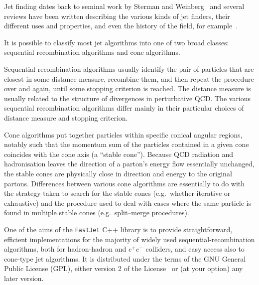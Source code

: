 \documentclass[12pt,a4]{article}
\newcommand{\fastjet}{\texttt{FastJet}\xspace}
\begin{document}
Jet finding dates back to seminal work by Sterman and
Weinberg~\cite{StermanWeinberg} and several reviews have been written
describing the various kinds of jet finders, their different uses and
properties, and even the history of the
field, for example~\cite{Moretti:1998qx,RunII-jet-physics,Ellis:2007ib,Salam:2009jx,Ali:2010tw}.

It is possible to classify most jet algorithms into one of two broad
classes: sequential recombination algorithms and cone algorithms.

Sequential recombination algorithms usually identify the pair of
particles that are closest in some distance measure, recombine them,
and then repeat the procedure over and again, until some stopping
criterion is reached. 
%
The distance measure is usually related to the structure of
divergences in perturbative QCD.
%
The various sequential recombination algorithms differ mainly in their
particular choices of distance measure and stopping criterion.

Cone algorithms put together particles within specific conical angular
regions, notably such that the momentum sum of the particles contained
in a given cone coincides with the cone axis (a ``stable cone'').
%
Because QCD radiation and hadronisation leaves the direction of a
parton's energy flow essentially unchanged, the stable cones are
physically close in direction and energy to the original partons.
%
Differences between various cone algorithms are essentially to do with
the strategy taken to search for the stable cones (e.g.\ whether
iterative or exhaustive) and the procedure used to deal with cases
where the same particle is found in multiple stable cones (e.g.\
split--merge procedures).

One of the aims of the \fastjet C++ library is to provide
straightforward, efficient implementations for the majority of widely
used sequential-recombination algorithms, both for hadron-hadron and
$e^+e^-$ colliders, and easy access also to cone-type jet algorithms.
%
It is distributed under the terms of the GNU General Public License
(GPL), either version 2 of the License~\cite{GPLv2} or (at your
option) any later version.
\end{document}

